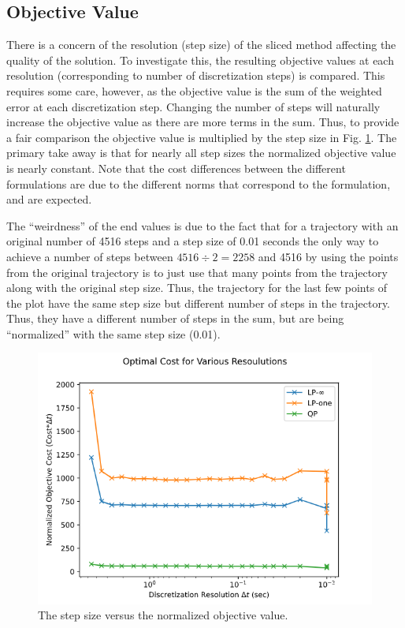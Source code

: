 \subsection{Objective Value} \label{ssec:obj_val}

There is a concern of the resolution (step size) of the sliced method affecting the quality of the solution. To investigate this, the resulting objective values at each resolution (corresponding to number of discretization steps) is compared. This requires some care, however, as the objective value is the sum of the weighted error at each discretization step. Changing the number of steps will naturally increase the objective value as there are more terms in the sum. Thus, to provide a fair comparison the objective value is multiplied by the step size in Fig. \ref{fig:norm_obj_val_dt}. The primary take away is that for nearly all step sizes the normalized objective value is nearly constant. Note that the cost differences between the different formulations are due to the different norms that correspond to the formulation, and are expected.

The ``weirdness'' of the end values is due to the fact that for a trajectory with an original number of 4516 steps and a step size of 0.01 seconds the only way to achieve a number of steps between $4516 \div 2 = 2258$ and 4516 by using the points from the original trajectory is to just use that many points from the trajectory along with the original step size. Thus, the trajectory for the last few points of the plot have the same step size but different number of steps in the trajectory. Thus, they have a different number of steps in the sum, but are being ``normalized'' with the same step size (0.01).

\begin{figure}
    \centering
    \includegraphics[width=\linewidth]{figs/costs.png}
    \caption{The step size versus the normalized objective value.}
    \label{fig:norm_obj_val_dt}
\end{figure}

